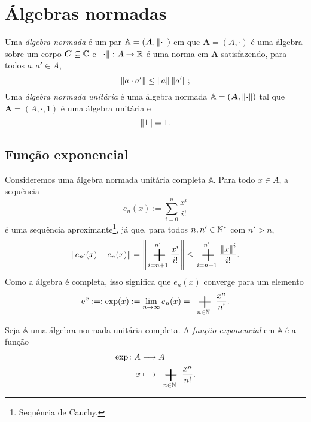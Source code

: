 \section{Álgebras normadas}

\begin{definition}
Uma \emph{álgebra normada} é um par $\mathbb A = (\bm A,\left\Vert{\bm{\cdot}}\right\Vert)$ em que $\bm A = (A,\cdot)$ é uma álgebra sobre um corpo $\bm C \subseteq \mathbb{C}$ e $\left\Vert{\bm{\cdot}}\right\Vert\colon A \to \mathbb{R}$ é uma norma em $\bm A$ satisfazendo, para todos $a,a' \in A$,
	\begin{equation*}
	\left\Vert{a \cdot a'}\right\Vert \leq \left\Vert{a}\right\Vert\left\Vert{a'}\right\Vert;
	\end{equation*}
Uma \emph{álgebra normada unitária} é uma álgebra normada $\mathbb A = (\bm A,\left\Vert{\bm{\cdot}}\right\Vert)$ tal que $\bm A = (A,\cdot,1)$ é uma álgebra unitária e
	\begin{equation*}
	\left\Vert{1}\right\Vert = 1.
	\end{equation*}
\end{definition}

\subsection{Função exponencial}

Consideremos uma álgebra normada unitária completa $\mathbb A$. Para todo $x \in A$, a sequência
	\begin{equation*}
	e_n(x) := \sum_{i=0}^{n} \frac{x^i}{i!}
	\end{equation*}
é uma sequência aproximante\footnote{Sequência de Cauchy.}, já que, para todos $n,n' \in \mathbb{N}^*$ com $n' > n$,
	\begin{equation*}
	\nor{e_{n'}(x)-e_n(x)} = \nor{\sum_{i=n+1}^{n'} \frac{x^i}{i!}} \leq \sum_{i=n+1}^{n'} \frac{\nor{x}^i}{i!}.
	\end{equation*}
Como a álgebra é completa, isso significa que $e_n(x)$ converge para um elemento
	\begin{equation*}
	\ee^{x} :=: \exp(x) := \lim_{n \to \infty} e_n(x) = \sum_{n \in \N} \frac{x^n}{n!}.
	\end{equation*}

\begin{definition}
Seja $\mathbb A$ uma álgebra normada unitária completa. A \emph{função exponencial} em $\mathbb A$ é a função
	\begin{align*}
	\func{\exp}{A}{A}{x}{\sum_{n \in \N} \frac{x^n}{n!}.}
	\end{align*}
\end{definition}

